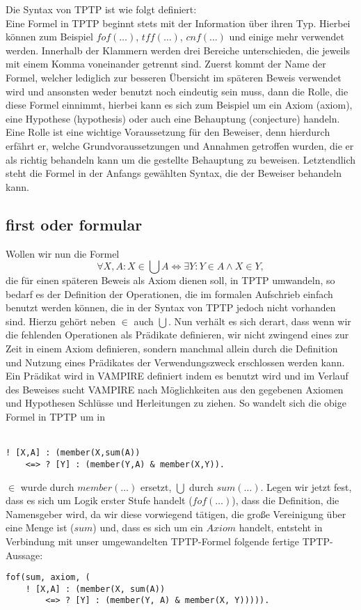 \documentclass{article}
\begin{document}
Die Syntax von TPTP ist wie folgt definiert:\\
Eine Formel in TPTP beginnt stets mit der Information über ihren Typ. Hierbei können zum Beispiel $fof(\dots)$, $tff(\dots)$, $cnf(\dots)$ und einige mehr verwendet werden.
Innerhalb der Klammern werden drei Bereiche unterschieden, die jeweils mit einem Komma voneinander getrennt sind. 
Zuerst kommt der Name der Formel, welcher lediglich zur besseren Übersicht im späteren Beweis verwendet wird und ansonsten weder benutzt noch eindeutig sein muss,
dann die Rolle, die diese Formel einnimmt, hierbei kann es sich zum Beispiel um ein Axiom (axiom), eine Hypothese (hypothesis) oder auch eine Behauptung (conjecture) handeln.
Eine Rolle ist eine wichtige Voraussetzung für den Beweiser, denn hierdurch erfährt er, welche Grundvoraussetzungen und Annahmen getroffen wurden, die er als richtig behandeln kann um die gestellte Behauptung zu beweisen.
Letztendlich steht die Formel in der Anfangs gewählten Syntax, die der Beweiser behandeln kann.



\subsection{first oder formular}
\label{subsec:tptpfof}
Wollen wir nun die Formel 
\[\forall X,A : X \in \bigcup A \Leftrightarrow \exists Y : Y \in A \land X \in Y,\]
die für einen späteren Beweis als Axiom dienen soll, in TPTP umwandeln, 
so bedarf es der Definition der Operationen, die im formalen Aufschrieb einfach benutzt werden können, 
die in der Syntax von TPTP jedoch nicht vorhanden sind.
Hierzu gehört neben $\in$ auch  $\bigcup$. 
Nun verhält es sich derart, dass wenn wir die fehlenden Operationen als Prädikate definieren, 
wir nicht zwingend eines zur Zeit in einem Axiom definieren, sondern manchmal allein durch die Definition und Nutzung eines Prädikates der Verwendungszweck erschlossen werden kann.
Ein Prädikat wird in VAMPIRE definiert indem es benutzt wird und im Verlauf des Beweises sucht VAMPIRE nach Möglichkeiten aus den gegebenen Axiomen und Hypothesen Schlüsse und Herleitungen zu ziehen.
So wandelt sich die obige Formel in TPTP um in \\ \\
\begin{lstlisting}[language=tptp]
! [X,A] : (member(X,sum(A))
	<=> ? [Y] : (member(Y,A) & member(X,Y)).
\end{lstlisting}
$\in$ wurde durch $member(\dots)$ ersetzt, $\bigcup$ durch $sum(\dots)$.
Legen wir jetzt fest, dass es sich um Logik erster Stufe handelt ($fof(\dots)$), dass die Definition, die Namensgeber wird, da wir diese vorwiegend tätigen, die große Vereinigung über eine Menge ist ($sum$) und, dass es sich um ein $Axiom$ handelt,
entsteht in Verbindung mit unser umgewandelten TPTP-Formel folgende fertige TPTP-Aussage:
\begin{lstlisting}[language=tptp]
fof(sum, axiom, (	
	! [X,A] : (member(X, sum(A)) 
		<=> ? [Y] : (member(Y, A) & member(X, Y))))).
\end{lstlisting}
\end{document}
